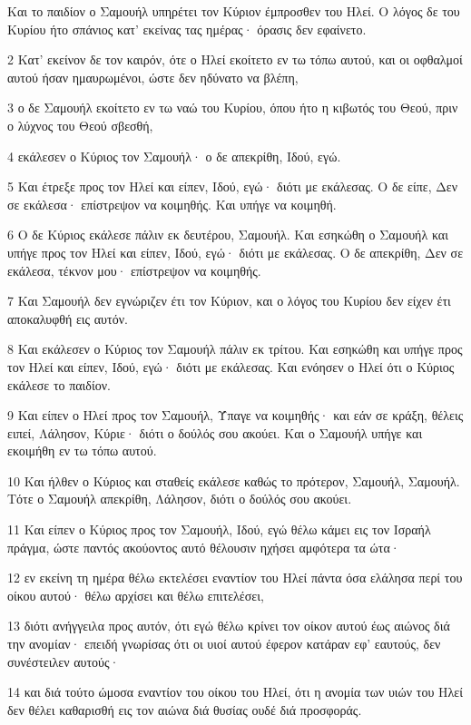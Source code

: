 \par Και το παιδίον ο Σαμουήλ υπηρέτει τον Κύριον έμπροσθεν του Ηλεί. Ο λόγος δε του Κυρίου ήτο σπάνιος κατ' εκείνας τας ημέρας· όρασις δεν εφαίνετο.
\par 2 Κατ' εκείνον δε τον καιρόν, ότε ο Ηλεί εκοίτετο εν τω τόπω αυτού, και οι οφθαλμοί αυτού ήσαν ημαυρωμένοι, ώστε δεν ηδύνατο να βλέπη,
\par 3 ο δε Σαμουήλ εκοίτετο εν τω ναώ του Κυρίου, όπου ήτο η κιβωτός του Θεού, πριν ο λύχνος του Θεού σβεσθή,
\par 4 εκάλεσεν ο Κύριος τον Σαμουήλ· ο δε απεκρίθη, Ιδού, εγώ.
\par 5 Και έτρεξε προς τον Ηλεί και είπεν, Ιδού, εγώ· διότι με εκάλεσας. Ο δε είπε, Δεν σε εκάλεσα· επίστρεψον να κοιμηθής. Και υπήγε να κοιμηθή.
\par 6 Ο δε Κύριος εκάλεσε πάλιν εκ δευτέρου, Σαμουήλ. Και εσηκώθη ο Σαμουήλ και υπήγε προς τον Ηλεί και είπεν, Ιδού, εγώ· διότι με εκάλεσας. Ο δε απεκρίθη, Δεν σε εκάλεσα, τέκνον μου· επίστρεψον να κοιμηθής.
\par 7 Και Σαμουήλ δεν εγνώριζεν έτι τον Κύριον, και ο λόγος του Κυρίου δεν είχεν έτι αποκαλυφθή εις αυτόν.
\par 8 Και εκάλεσεν ο Κύριος τον Σαμουήλ πάλιν εκ τρίτου. Και εσηκώθη και υπήγε προς τον Ηλεί και είπεν, Ιδού, εγώ· διότι με εκάλεσας. Και ενόησεν ο Ηλεί ότι ο Κύριος εκάλεσε το παιδίον.
\par 9 Και είπεν ο Ηλεί προς τον Σαμουήλ, Ύπαγε να κοιμηθής· και εάν σε κράξη, θέλεις ειπεί, Λάλησον, Κύριε· διότι ο δούλός σου ακούει. Και ο Σαμουήλ υπήγε και εκοιμήθη εν τω τόπω αυτού.
\par 10 Και ήλθεν ο Κύριος και σταθείς εκάλεσε καθώς το πρότερον, Σαμουήλ, Σαμουήλ. Τότε ο Σαμουήλ απεκρίθη, Λάλησον, διότι ο δούλός σου ακούει.
\par 11 Και είπεν ο Κύριος προς τον Σαμουήλ, Ιδού, εγώ θέλω κάμει εις τον Ισραήλ πράγμα, ώστε παντός ακούοντος αυτό θέλουσιν ηχήσει αμφότερα τα ώτα·
\par 12 εν εκείνη τη ημέρα θέλω εκτελέσει εναντίον του Ηλεί πάντα όσα ελάλησα περί του οίκου αυτού· θέλω αρχίσει και θέλω επιτελέσει,
\par 13 διότι ανήγγειλα προς αυτόν, ότι εγώ θέλω κρίνει τον οίκον αυτού έως αιώνος διά την ανομίαν· επειδή γνωρίσας ότι οι υιοί αυτού έφερον κατάραν εφ' εαυτούς, δεν συνέστειλεν αυτούς·
\par 14 και διά τούτο ώμοσα εναντίον του οίκου του Ηλεί, ότι η ανομία των υιών του Ηλεί δεν θέλει καθαρισθή εις τον αιώνα διά θυσίας ουδέ διά προσφοράς.
